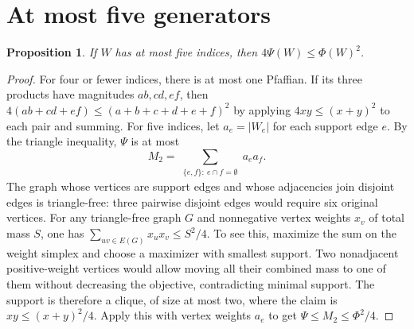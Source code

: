 \documentclass[11pt]{article}
\newtheorem{proposition}[theorem]{Proposition}
\begin{document}
\section{At most five generators}
\begin{proposition}\label{prop:five}
If $W$ has at most five indices, then $4\Psi(W)\leq\Phi(W)^2$.
\end{proposition}
\begin{proof}
For four or fewer indices, there is at most one Pfaffian. If its three products have magnitudes $ab,cd,ef$, then $4(ab+cd+ef)\leq(a+b+c+d+e+f)^2$ by applying $4xy\leq(x+y)^2$ to each pair and summing. For five indices, let $a_e=|W_e|$ for each support edge $e$. By the triangle inequality, $\Psi$ is at most
\[
 M_2=\sum_{\substack{\{e,f\}:\ e\cap f=\emptyset}}a_ea_f.
\]
The graph whose vertices are support edges and whose adjacencies join disjoint edges is triangle-free: three pairwise disjoint edges would require six original vertices. For any triangle-free graph $G$ and nonnegative vertex weights $x_v$ of total mass $S$, one has $\sum_{uv\in E(G)}x_ux_v\leq S^2/4$. To see this, maximize the sum on the weight simplex and choose a maximizer with smallest support. Two nonadjacent positive-weight vertices would allow moving all their combined mass to one of them without decreasing the objective, contradicting minimal support. The support is therefore a clique, of size at most two, where the claim is $xy\leq(x+y)^2/4$. Apply this with vertex weights $a_e$ to get $\Psi\leq M_2\leq\Phi^2/4$.
\end{proof}
\end{document}
